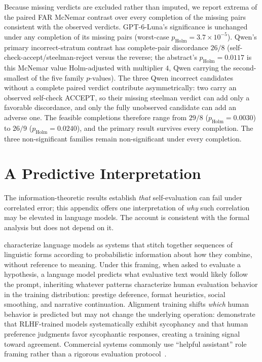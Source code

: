 \documentclass[a4paper,journal]{IAENGtran}
\begin{document}
Because missing verdicts are excluded rather than imputed, we report extrema of
the paired FAR
McNemar contrast over every completion of the missing pairs consistent with
the observed verdicts. GPT-6-Luna's significance is unchanged under any completion of
its missing pairs (worst-case
$p_{\mathrm{Holm}}=3.7\times10^{-5}$). Qwen's primary incorrect-stratum contrast has
complete-pair discordance $26/8$
(self-check-accept/steelman-reject versus the reverse; the abstract's
$p_{\mathrm{Holm}}=0.0117$ is this McNemar value Holm-adjusted with multiplier $4$,
Qwen carrying the second-smallest of the five family $p$-values). The three Qwen
incorrect candidates without a complete paired verdict contribute asymmetrically:
two carry an observed self-check ACCEPT, so their missing steelman verdict can add
only a favorable discordance, and only the fully unobserved candidate can add an
adverse one. The feasible completions therefore range from $29/8$
($p_{\mathrm{Holm}}=0.0030$) to $26/9$ ($p_{\mathrm{Holm}}=0.0240$), and the
primary result survives every completion. The three non-significant families remain
non-significant under every completion.

\section{A Predictive Interpretation}
\label{app:mechanism}

The information-theoretic results establish \emph{that} self-evaluation can fail under
correlated error; this appendix offers one interpretation of \emph{why} such
correlation may be elevated in language models. The account is consistent with the
formal analysis but does not depend on it.

\cite{bender2021parrots} characterize language models as systems that stitch together
sequences of linguistic forms according to probabilistic information about how they
combine, without reference to meaning. Under this framing, when asked to evaluate a
hypothesis, a language model predicts what evaluative text would likely follow the
prompt, inheriting whatever patterns characterize human evaluation behavior in the
training distribution: prestige deference, format heuristics, social smoothing, and
narrative continuation. Alignment training shifts \emph{which} human behavior is
predicted but may not change the underlying operation: \cite{sharma2024sycophancy}
demonstrate that RLHF-trained models systematically exhibit sycophancy and that human
preference judgments favor sycophantic responses, creating a training signal toward
agreement. Commercial systems commonly use ``helpful assistant'' role framing rather than a
rigorous evaluation protocol~\cite{zheng2023helpful}.
\end{document}
